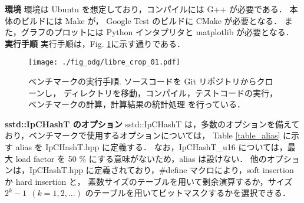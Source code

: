 
\newpage
{\bf 環境}
\samepage\newline\indent
環境は Ubuntu を想定しており，コンパイルには G++ が必要である．
本体のビルドには Make が，
Google Test のビルドに CMake が必要となる．
また，グラフのプロットには Python インタプリタと matplotlib が必要となる．
\\

{\bf 実行手順}
\samepage\newline\indent
実行手順は，Fig. \ref{fig_command}に示す通りである．
\begin{figure}[h]
  \texttt{[image: ./fig\_odg/libre\_crop\_01.pdf]}
  \caption{
    ベンチマークの実行手順.
    ソースコードを Git リポジトリからクローンし，
    ディレクトリを移動，コンパイル，テストコードの実行，ベンチマークの計算，計算結果の統計処理
    を行っている．
  }
  \label{fig_command}
\end{figure}

{\bf sstd::IpCHashT のオプション}
\samepage\newline\indent
sstd::IpCHashT は，多数のオプションを備えており，ベンチマークで使用するオプションについては，
Table \ref{table_alias} に示す alias を IpCHashT.hpp に定義する．
なお，IpCHashT\_u16 については，最大 load factor を 50 \% にする意味がないため，alias は設けない．
他のオプションは，IpCHashT.hpp に定義されており，\#define マクロにより，soft insertion か hard insertion と，
素数サイズのテーブルを用いて剰余演算するか，サイズ $2^k-1\ \ (k=1,2,...)$ のテーブルを用いてビットマスクするかを選択できる．


